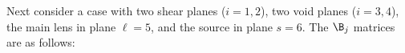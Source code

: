 Next consider a case with two shear planes ($i = 1,2$), two void planes ($i = 3,4$), the main lens in plane $\ell = 5$, and the source in plane $s = 6$. The $\B_j$ matrices are as follows:
  